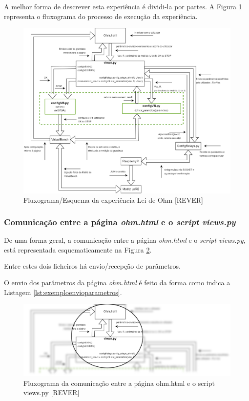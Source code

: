 A melhor forma de descrever esta experiência é dividi-la por partes. A Figura \ref{fig:fluxohm} representa o fluxograma do processo de execução da experiência.
\begin{figure}[hbtp]
	\centering
	\includegraphics[width=1\textwidth]{figures/ohm_diagrama.drawio.png}
	\caption{Fluxograma/Esquema da experiência Lei de Ohm [REVER]}
	\label{fig:fluxohm}
\end{figure}

\subsubsection{Comunicação entre a página \textit{ohm.html} e o \textit{script views.py}}
De uma forma geral, a comunicação entre a página \textit{ohm.html} e o \textit{script views.py}, está representada esquematicamente na Figura \ref{fig:fluxohmpormenor}.

Entre estes dois ficheiros há envio/recepção de parâmetros.

O envio dos parâmetros da página \textit{ohm.html} é feito da forma como indica a Listagem \ref{lst:exemploenvioparametros}.

\begin{figure}[hbtp]
	\centering
	\includegraphics[width=1\textwidth]{figures/ohm_diagrama_pormenor.drawio.png}
	\caption{Fluxograma da comunicação entre a página ohm.html e o script views.py [REVER]}
	\label{fig:fluxohmpormenor}
\end{figure}

